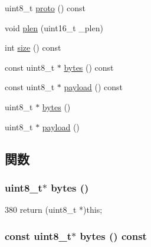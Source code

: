 \begin{DoxyCompactItemize}
\item 
uint8\_\-t \hyperlink{structNet_1_1Ip6Hdr_abb57dba0db48d3e9fea9d5aedf436c3e}{proto} () const 
\item 
void \hyperlink{structNet_1_1Ip6Hdr_a081a2967518430d101328245d43d3be5}{plen} (uint16\_\-t \_\-plen)
\item 
int \hyperlink{structNet_1_1Ip6Hdr_ab8e4e3e2a7bf18888b71bdf9dda0770b}{size} () const 
\item 
const uint8\_\-t $\ast$ \hyperlink{structNet_1_1Ip6Hdr_aaa586eeaf354005403ca8e20f961b6c3}{bytes} () const 
\item 
const uint8\_\-t $\ast$ \hyperlink{structNet_1_1Ip6Hdr_a5f0d069ddb9d067af9e94963bd1fc7a2}{payload} () const 
\item 
uint8\_\-t $\ast$ \hyperlink{structNet_1_1Ip6Hdr_add4fb6fe45a091194dc9eac521194698}{bytes} ()
\item 
uint8\_\-t $\ast$ \hyperlink{structNet_1_1Ip6Hdr_a79ce21e3572e587b71de7af1ac640b6f}{payload} ()
\end{DoxyCompactItemize}


\subsection{関数}
\hypertarget{structNet_1_1Ip6Hdr_add4fb6fe45a091194dc9eac521194698}{
\subsubsection[{bytes}]{\setlength{\rightskip}{0pt plus 5cm}uint8\_\-t$\ast$ bytes ()}}
\label{structNet_1_1Ip6Hdr_add4fb6fe45a091194dc9eac521194698}



\begin{DoxyCode}
380 { return (uint8_t *)this; }
\end{DoxyCode}
\hypertarget{structNet_1_1Ip6Hdr_aaa586eeaf354005403ca8e20f961b6c3}{
\subsubsection[{bytes}]{\setlength{\rightskip}{0pt plus 5cm}const uint8\_\-t$\ast$ bytes () const}}
\label{structNet_1_1Ip6Hdr_aaa586eeaf354005403ca8e20f961b6c3}



